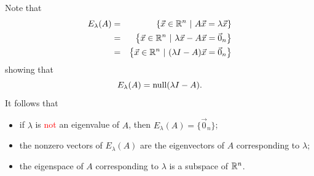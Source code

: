 \documentclass[pdf,9pt]{beamer}
\begin{document}
\begin{frame}[fragile]
\begin{emptytitle}
    Note that
    \begin{eqnarray*}
	E_{\lambda}(A)
	& = & \left\{ \vec{x}\in\mathbb{R}^n ~|~ A\vec{x}=\lambda\vec{x} \right\}               \\
	& = & \left\{ \vec{x}\in\mathbb{R}^n ~|~ \lambda\vec{x}  - A\vec{x}=\vec{0}_n \right\} \\
	& = & \left\{ \vec{x}\in\mathbb{R}^n ~|~ (\lambda I - A)\vec{x}=\vec{0}_n \right\}
    \end{eqnarray*}
    showing that
    \[  E_{\lambda}(A) = \mbox{null}(\lambda I-A).\]
    \pause
    It follows that
    \begin{itemize}
    \item if $\lambda$ is \textcolor{red}{not} an eigenvalue of $A$,
    then $E_{\lambda}(A)=\{\vec{0}_n\}$;
    \item the nonzero vectors of $E_{\lambda}(A)$ are the
    eigenvectors of $A$ corresponding to $\lambda$;
    \item
    the eigenspace of $A$ corresponding to $\lambda$
    is a subspace of $\mathbb{R}^n$.
    \end{itemize}
\end{emptytitle}
\end{frame}
\end{document}
